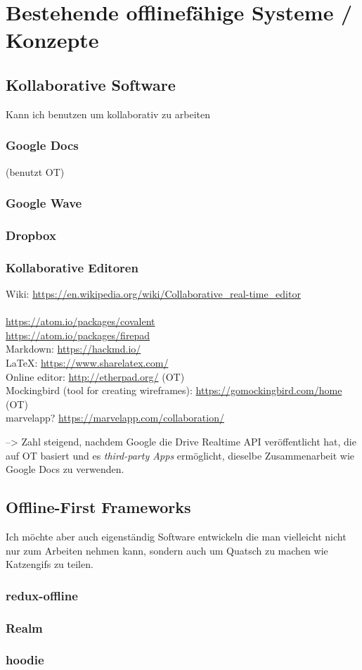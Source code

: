 \chapter{\label{chap:state}Bestehende offlinefähige Systeme / Konzepte}
\section{Kollaborative Software}
Kann ich benutzen um kollaborativ zu arbeiten
\subsection{Google Docs}
(benutzt OT)
\subsection{Google Wave}
\subsection{Dropbox}
\subsection{Kollaborative Editoren}
Wiki: \url{https://en.wikipedia.org/wiki/Collaborative_real-time_editor}\\\\
\url{https://atom.io/packages/covalent}\\
\url{https://atom.io/packages/firepad}\\
Markdown: \url{https://hackmd.io/}\\
LaTeX: \url{https://www.sharelatex.com/}\\
Online editor: \url{http://etherpad.org/} (OT)\\
Mockingbird (tool for creating wireframes): \url{https://gomockingbird.com/home} (OT)\\
marvelapp? \url{https://marvelapp.com/collaboration/}

--> Zahl steigend, nachdem Google die Drive Realtime API veröffentlicht hat, die auf \gls{OT} basiert und es \textit{third-party Apps} ermöglicht, dieselbe Zusammenarbeit wie Google Docs zu verwenden.
\section{Offline-First Frameworks}
Ich möchte aber auch eigenständig Software entwickeln die man vielleicht nicht nur zum Arbeiten nehmen kann, sondern auch um Quatsch zu machen wie Katzengifs zu teilen.
\subsection{redux-offline}
\subsection{Realm}
\cite{realm}
\subsection{hoodie}
\cite{hoodie}